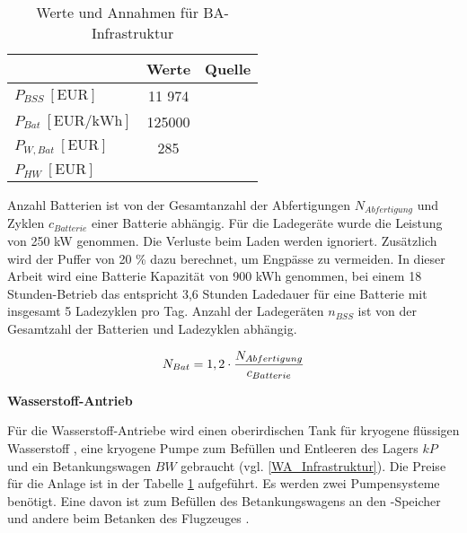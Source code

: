 \begin{table}[h]
	\begin{center}
    \caption{Werte und Annahmen für BA-Infrastruktur}
	\label{BA_Infrastrukturtab}
	\begin{tabular}{|l|c|c|}
		\hline
		 & \textbf{Werte} & \textbf{Quelle} \\ \hline
		$P_{BSS} ~[\text{EUR}]$ &  11 974  & \cite{guo2020aviation} \\ \hline
		$P_{Bat} ~[\text{EUR/kWh}]$ & 125000 & \cite{guo2020aviation} \\ \hline
		$P_{W,Bat} ~[\text{EUR}] $ & 285  & \cite{guo2023infrastructure}\\ \hline
      $P_{HW} ~[\text{EUR}] $ &  &\\ \hline
	\end{tabular}
    \end{center}
\end{table}

Anzahl Batterien ist von der Gesamtanzahl der Abfertigungen $N_{Abfertigung}$ und Zyklen $c_{Batterie}$ einer Batterie abhängig. 
Für die Ladegeräte wurde die Leistung
von 250 kW genommen. Die Verluste beim Laden werden ignoriert. Zusätzlich wird der Puffer von 20 \% dazu berechnet, um 
Engpässe zu vermeiden. In dieser Arbeit wird eine Batterie Kapazität von 900 kWh genommen, bei einem 18 Stunden-Betrieb 
das entspricht 3,6 Stunden Ladedauer für eine Batterie mit insgesamt 5 Ladezyklen pro Tag. 
Anzahl der Ladegeräten $n_{BSS}$ ist von der Gesamtzahl der Batterien und Ladezyklen abhängig.

\begin{equation}
  {N_{Bat}} = {1,2} \cdot \frac{N_{Abfertigung}}{c_{Batterie}}\\
  \label{BatAnzahl}
  \end{equation}

\textbf{Wasserstoff-Antrieb}


Für die Wasserstoff-Antriebe wird einen oberirdischen Tank für kryogene flüssigen Wasserstoff , eine kryogene Pumpe 
zum Befüllen und Entleeren des Lagers ${kP}$ und ein Betankungswagen ${BW}$ gebraucht (vgl. \eqref{WA_Infrastruktur}). 
Die Preise für die Anlage ist in der Tabelle \ref{BA_Infrastrukturtab} aufgeführt. Es werden zwei Pumpensysteme benötigt.
Eine davon ist zum Befüllen des Betankungswagens an den -Speicher und andere beim Betanken des Flugzeuges \cite{hoelzen2022h2}.

